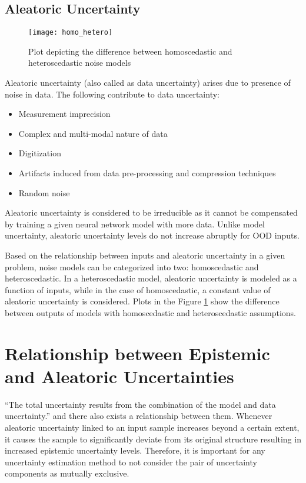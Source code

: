 	\subsection{Aleatoric Uncertainty}
		 \begin{figure}[H]
		\centering
		\texttt{[image: homo\_hetero]}
		\caption[Homoscedastic and heteroscedastic model outputs]{Plot depicting the difference between homoscedastic and heteroscedastic noise models}
		\label{fig_homo_hetero}
	\end{figure}
	Aleatoric uncertainty (also called as data uncertainty) arises due to presence of noise in data. The following contribute to data uncertainty:
	\begin{itemize}
	\item Measurement imprecision
	\item Complex and multi-modal nature of data
	\item Digitization
	\item Artifacts induced from data pre-processing and compression techniques
	\item Random noise
	\end{itemize}
 	Aleatoric uncertainty is considered to be irreducible as it cannot be compensated by training a given neural network model with more data. Unlike model uncertainty, aleatoric uncertainty levels do not increase abruptly for OOD inputs. 
 	
 	Based on the relationship between inputs and aleatoric uncertainty in a given problem, noise models can be categorized into two: homoscedastic and heteroscedastic. In a heteroscedastic model, aleatoric uncertainty is modeled as a function of inputs, while in the case of homoscedastic, a constant value of aleatoric uncertainty is considered. Plots in the Figure \ref{fig_homo_hetero} show the difference between outputs of models with homoscedastic and heteroscedastic assumptions.

	\section{Relationship between Epistemic and Aleatoric Uncertainties}
	 	\enquote{The total uncertainty results from the combination of the model and data uncertainty.} \cite{loquercio2020a} and there also exists a relationship between them. Whenever aleatoric uncertainty linked to an input sample increases beyond a certain extent, it causes the sample to significantly deviate from its original structure resulting in increased epistemic uncertainty levels. Therefore, it is important for any uncertainty estimation method to not consider the pair of uncertainty components as mutually exclusive. 
	 